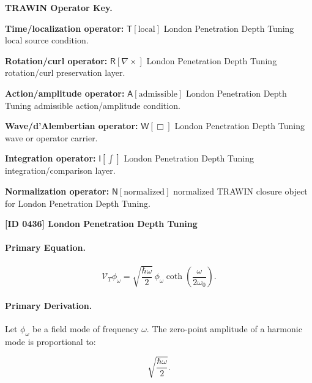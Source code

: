 \par\vspace{0.45\baselineskip}
\noindent\begin{minipage}[t]{\linewidth}
\begingroup
\small
\raggedright
\textbf{TRAWIN Operator Key.}\par
\noindent\textbf{Time/localization operator:} $\mathsf{T}\!\left[\mathrm{local}\right]$ London Penetration Depth Tuning local source condition.\par
\noindent\textbf{Rotation/curl operator:} $\mathsf{R}\!\left[\nabla\times\right]$ London Penetration Depth Tuning rotation/curl preservation layer.\par
\noindent\textbf{Action/amplitude operator:} $\mathsf{A}\!\left[\mathrm{admissible}\right]$ London Penetration Depth Tuning admissible action/amplitude condition.\par
\noindent\textbf{Wave/d'Alembertian operator:} $\mathsf{W}\!\left[\Box\right]$ London Penetration Depth Tuning wave or operator carrier.\par
\noindent\textbf{Integration operator:} $\mathsf{I}\!\left[\int\right]$ London Penetration Depth Tuning integration/comparison layer.\par
\noindent\textbf{Normalization operator:} $\mathsf{N}\!\left[\mathrm{normalized}\right]$ normalized TRAWIN closure object for London Penetration Depth Tuning.\par
\endgroup
\end{minipage}

\clearpage
\noindent\textbf{[ID 0436] London Penetration Depth Tuning}\par
\vspace{0.35em}
\paragraph{Primary Equation.}
\begin{equation}
\mathcal{V}_T\phi_{\omega}
=
\sqrt{
\frac{\hbar\omega}{2}
}
\,\phi_{\omega}
\coth\left(
\frac{\omega}{2\omega_0}
\right).
\end{equation}

\paragraph{Primary Derivation.}
Let $\phi_{\omega}$ be a field mode of frequency $\omega$.  
The zero-point amplitude of a harmonic mode is proportional to:

\begin{equation}
\sqrt{\frac{\hbar\omega}{2}} .
\end{equation}

